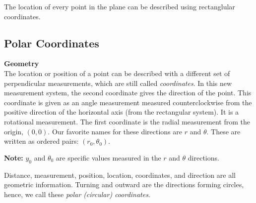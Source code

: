 \documentclass{ximera}
\begin{document}
\qquad

The location of every point in the plane can be described using rectanglular coordinates.








\subsection*{Polar Coordinates}

\textbf{\textcolor{purple!85!blue}{Geometry}} \\



The location or position of a point can be described with a different set of perpendicular measurements, which are still called \textit{coordinates}.  In this new measurement system, the second coordinate gives the direction of the point. This coordinate is given as an angle measurement measured counterclockwise from the positive direction of the horizontal axis (from the rectangular system). It is a rotational measurement.  The first coordinate is the radial measurement from the origin, $(0,0)$. Our favorite names for these directions are $r$ and $\theta$. These are written as ordered pairs: $(r_0, \theta_0)$.

\textbf{Note:} $y_0$ and $\theta_0$ are specific values measured in the $r$ and $\theta$ directions. 

Distance, measurement, position, location, coordinates, and direction are all geometric information.  Turning and outward are the directions forming circles, hence, we call these \textit{polar (circular) coordinates}.
\end{document}
